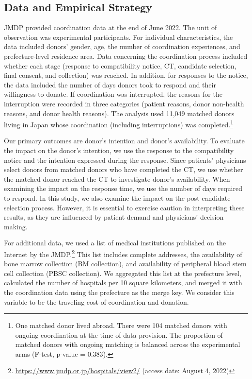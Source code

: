 \documentclass[12pt, a4paper]{article}
\begin{document}
\hypertarget{data-and-empirical-strategy}{%
\subsection{Data and Empirical Strategy}\label{data-and-empirical-strategy}}

JMDP provided coordination data at the end of June 2022. The unit of observation was experimental participants. For individual characteristics, the data included donors' gender, age, the number of coordination experiences, and prefecture-level residence area. Data concerning the coordination process included whether each stage (response to compatibility notice, CT, candidate selection, final consent, and collection) was reached. In addition, for responses to the notice, the data included the number of days donors took to respond and their willingness to donate. If coordination was interrupted, the reasons for the interruption were recorded in three categories (patient reasons, donor non-health reasons, and donor health reasons). The analysis used 11,049 matched donors living in Japan whose coordination (including interruptions) was completed.\footnote{One matched donor lived abroad. There were 104 matched donors with ongoing coordination at the time of data provision. The proportion of matched donors with ongoing matching is balanced across the experimental arms (F-test, p-value = \(0.383\)).}

Our primary outcomes are donor's intention and donor's availability. To evaluate the impact on the donor's intention, we use the response to the compatibility notice and the intention expressed during the response. Since patients' physicians select donors from matched donors who have completed the CT, we use whether the matched donor reached the CT to investigate donor's availability. When examining the impact on the response time, we use the number of days required to respond. In this study, we also examine the impact on the post-candidate selection process. However, it is essential to exercise caution in interpreting these results, as they are influenced by patient demand and physicians' decision making.

For additional data, we used a list of medical institutions published on the Internet by the JMDP.\footnote{\url{https://www.jmdp.or.jp/hospitals/view2/} (access date: August 4, 2022)} This list includes complete addresses, the availability of bone marrow collection (BM collection), and availability of peripheral blood stem cell collection (PBSC collection). We aggregated this list at the prefecture level, calculated the number of hospitals per 10 square kilometers, and merged it with the coordination data using the prefecture as the merge key. We consider this variable to be the traveling cost of coordination and donation.
\end{document}
